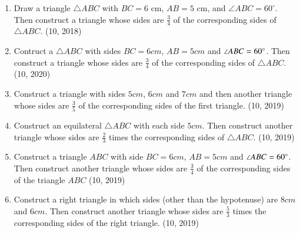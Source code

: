 \begin{enumerate}[label=\thesubsection.\arabic*,ref=\thesubsection.\theenumi]
    \item Draw a triangle $\triangle ABC$ with $BC = 6 \text{ cm}$, $AB = 5 \text{ cm}$, and $\angle ABC = 60^\circ$. Then construct a triangle whose sides are $\frac{3}{4}$ of the corresponding sides of $\triangle ABC$. \hfill (10, 2018)
	\item Contruct a $\triangle ABC $ with sides $BC = 6 cm$, $AB = 5 cm$ and $\angle ABC = 60\degree$. Then construct a triangle whose sides are $\frac{3}{4}$ of the corresponding sides of $\triangle ABC$.
		\hfill (10, 2020)
\item Construct a triangle with sides $5cm$, $6cm$ and $7cm$ and then another triangle whose sides are $\frac{3}{5}$ of the corresponding sides of the first triangle.
		\hfill (10, 2019)
\item Construct an equilateral $\triangle ABC$ with each side $5 cm$. Then construct another triangle whose sides are $\frac{2}{3}$ times the corresponding sides of $\triangle ABC$.
		\hfill (10, 2019)
\item Construct a triangle $ABC$ with side $BC = 6 cm$, $AB = 5 cm$ and $\angle ABC = 60\degree$. Then construct another triangle whose sides are $\frac{3}{4}$ of the corresponding sides of the triangle $ABC$
		\hfill (10, 2019)
\item Construct a right triangle in which sides (other than the hypotenuse) are $8 cm$ and $6 cm$. Then construct another triangle whose sides are $\frac{5}{3}$ times the corresponding sides of the right triangle.
		\hfill (10, 2019)


\end{enumerate}
